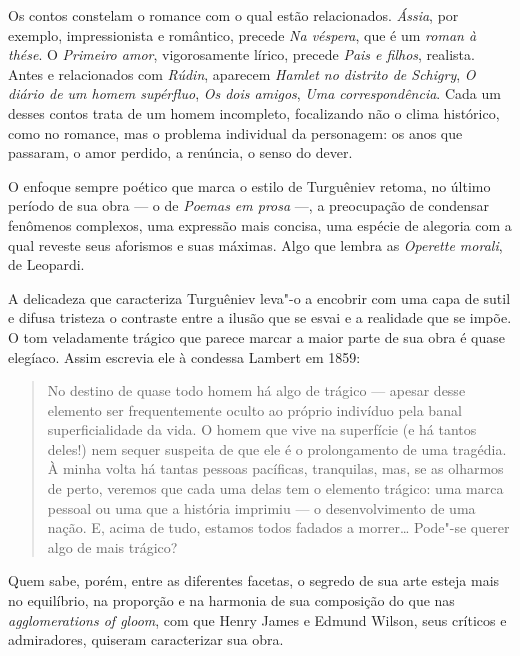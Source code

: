 Os contos constelam o romance com o qual estão relacionados.
\emph{Ássia}, por exemplo, impressionista e romântico, precede \emph{Na
véspera}, que é um \emph{roman à thése}. O \emph{Primeiro amor},
vigorosamente lírico, precede \emph{Pais e filhos}, realista. Antes e relacionados
com \emph{Rúdin}, aparecem \emph{Hamlet no distrito de Schigry}, \emph{O
diário de um homem supérfluo}, \emph{Os dois amigos}, \emph{Uma
correspondência}. Cada um desses contos trata de um homem incompleto,
focalizando não o clima histórico, como no romance, mas o problema
individual da personagem: os anos que passaram, o amor perdido, a
renúncia, o senso do dever.

O enfoque sempre poético que marca o estilo de Turguêniev retoma, no
último período de sua obra --- o de \emph{Poemas em prosa} ---, a
preocupação de condensar fenômenos complexos, uma expressão mais
concisa, uma espécie de alegoria com a qual reveste seus aforismos e
suas máximas. Algo que lembra as \emph{Operette morali}, de Leopardi.

A delicadeza que caracteriza Turguêniev leva"-o a encobrir com uma capa
de sutil e difusa tristeza o contraste entre a ilusão que se esvai e a
realidade que se impõe. O tom veladamente trágico que parece marcar a
maior parte de sua obra é quase elegíaco. Assim escrevia ele à condessa
Lambert em 1859:

\begin{quotation}
No destino de quase todo homem há algo de trágico --- apesar desse
elemento ser frequentemente oculto ao próprio indivíduo pela banal
superficialidade da vida. O homem que vive na superfície (e há tantos
deles!) nem sequer suspeita de que ele é o prolongamento de uma
tragédia. À minha volta há tantas pessoas pacíficas, tranquilas, mas, se as
olharmos de perto, veremos que cada uma delas tem o elemento trágico: uma
marca pessoal ou uma que a história imprimiu --- o desenvolvimento de uma
nação. E, acima de tudo, estamos todos fadados a morrer\ldots{} Pode"-se
querer algo de mais trágico?
\end{quotation}

Quem sabe, porém, entre as diferentes facetas, o segredo de sua arte esteja mais no
equilíbrio, na proporção e na harmonia de sua composição do que nas
\emph{agglomerations of gloom}, com que Henry James e Edmund Wilson, seus
críticos e admiradores, quiseram caracterizar sua obra.

\medskip

